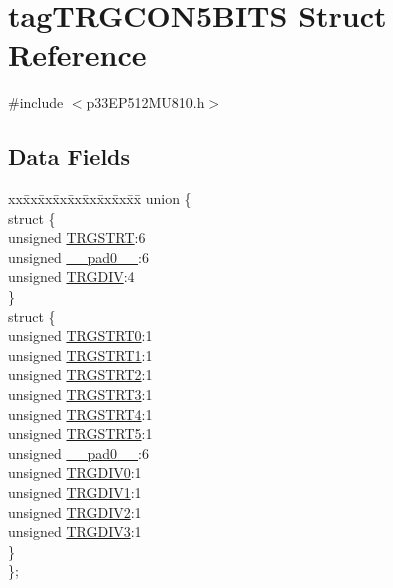 \hypertarget{structtag_t_r_g_c_o_n5_b_i_t_s}{}\section{tag\+T\+R\+G\+C\+O\+N5\+B\+I\+TS Struct Reference}
\label{structtag_t_r_g_c_o_n5_b_i_t_s}


{\ttfamily \#include $<$p33\+E\+P512\+M\+U810.\+h$>$}

\subsection*{Data Fields}
\begin{DoxyCompactItemize}
\item 
\begin{tabbing}
xx\=xx\=xx\=xx\=xx\=xx\=xx\=xx\=xx\=\kill
union \{\\
\>struct \{\\
\>\>unsigned \hyperlink{structtag_t_r_g_c_o_n5_b_i_t_s_a53d84dcc3e23b3d2db356ea32c245b6f}{TRGSTRT}:6\\
\>\>unsigned \hyperlink{structtag_t_r_g_c_o_n5_b_i_t_s_adf71f3d8410c1f1dbbc96680a92c49af}{\_\_pad0\_\_}:6\\
\>\>unsigned \hyperlink{structtag_t_r_g_c_o_n5_b_i_t_s_a10310cfb772e07d5f62911d0619c3ae0}{TRGDIV}:4\\
\>\} \\
\>struct \{\\
\>\>unsigned \hyperlink{structtag_t_r_g_c_o_n5_b_i_t_s_a75147b4831d3afa487fe9999d2a58c67}{TRGSTRT0}:1\\
\>\>unsigned \hyperlink{structtag_t_r_g_c_o_n5_b_i_t_s_ac76b84548f8cfa382a2d703890b58dad}{TRGSTRT1}:1\\
\>\>unsigned \hyperlink{structtag_t_r_g_c_o_n5_b_i_t_s_a66e40dba969f7a5eafe81b8f341dd665}{TRGSTRT2}:1\\
\>\>unsigned \hyperlink{structtag_t_r_g_c_o_n5_b_i_t_s_a20e528d9be27fc91e2d28bb69f809c0a}{TRGSTRT3}:1\\
\>\>unsigned \hyperlink{structtag_t_r_g_c_o_n5_b_i_t_s_a9e26684d05dfb877c150795a627387cc}{TRGSTRT4}:1\\
\>\>unsigned \hyperlink{structtag_t_r_g_c_o_n5_b_i_t_s_aabeb06bb6258310e01e1a0cd96bf30ca}{TRGSTRT5}:1\\
\>\>unsigned \hyperlink{structtag_t_r_g_c_o_n5_b_i_t_s_adf71f3d8410c1f1dbbc96680a92c49af}{\_\_pad0\_\_}:6\\
\>\>unsigned \hyperlink{structtag_t_r_g_c_o_n5_b_i_t_s_a6d425374bc65bb89be540344ef5393e5}{TRGDIV0}:1\\
\>\>unsigned \hyperlink{structtag_t_r_g_c_o_n5_b_i_t_s_a92a66ed2923cfb0f855e3d9fe36654f9}{TRGDIV1}:1\\
\>\>unsigned \hyperlink{structtag_t_r_g_c_o_n5_b_i_t_s_a8a4ec980bd7f8bdb174f00a7888cdfce}{TRGDIV2}:1\\
\>\>unsigned \hyperlink{structtag_t_r_g_c_o_n5_b_i_t_s_a0b99e8f3f8539f9bf133127a32824612}{TRGDIV3}:1\\
\>\} \\
\}; \\


\end{tabbing}
\end{DoxyCompactItemize}
